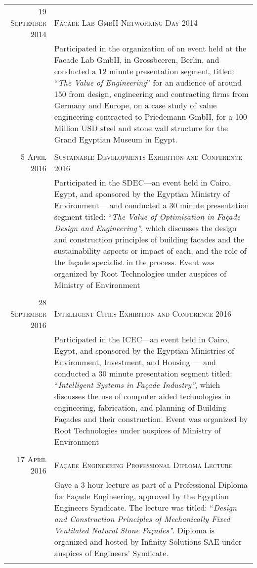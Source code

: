 \documentclass[a4paper,11pt]{article} %
\begin{document}
\begin{tabular}{r|p{11cm}}
\textsc{19 September 2014} & \textsc{Facade Lab GmbH Networking Day 2014}\\ 
& \footnotesize{Participated in the organization of an event held at the Facade Lab GmbH, in Grossbeeren, Berlin, and conducted a 12 minute presentation segment, titled: ``\emph{The Value of Engineering}'' for an audience of around 150 from design, engineering and contracting firms from Germany and Europe, on a case study of value engineering contracted to Priedemann GmbH, for a 100 Million USD steel and stone wall structure for the Grand Egyptian Museum in Egypt.}\\
\multicolumn{2}{c}{} \\

\textsc{5 April 2016} & \textsc{Sustainable Developments Exhibition and Conference 2016}\\ 
& \footnotesize{Participated in the SDEC---an event held in Cairo, Egypt, and sponsored by the Egyptian Ministry of Environment--- and conducted a 30 minute presentation segment titled: ``\emph{The Value of Optimisation in Fa\c{c}ade Design and Engineering''}, which discusses the design and construction principles of building facades and the sustainability aspects or impact of each, and the role of the fa\c{c}ade specialist in the process. Event was organized by Root Technologies under auspices of Ministry of Environment}\\
\multicolumn{2}{c}{} \\

\textsc{28 September 2016} & \textsc{Intelligent Cities Exhibition and Conference 2016}\\ 
& \footnotesize{Participated in the ICEC---an event held in Cairo, Egypt, and sponsored by the Egyptian Ministries of Environment, Investment, and Housing --- and conducted a 30 minute presentation segment titled: ``\emph{Intelligent Systems in Fa\c{c}ade Industry''}, which discusses the use of computer aided technologies in engineering, fabrication, and planning of Building Fa\c{c}ades and their construction. Event was organized by Root Technologies under auspices of Ministry of Environment}\\
\multicolumn{2}{c}{} \\

\textsc{17 April 2016} & \textsc{Fa\c{c}ade Engineering Professional Diploma Lecture}\\ 
& \footnotesize{Gave a 3 hour lecture as part of a Professional Diploma for Fa\c{c}ade Engineering, approved by the Egyptian Engineers Syndicate. The lecture was titled: ``\emph{Design and Construction Principles of Mechanically Fixed Ventilated Natural Stone Fa\c{c}ades'}'. Diploma is organized and hosted by Infinity Solutions SAE under auspices of Engineers' Syndicate.}\\
\multicolumn{2}{c}{} \\
	
\end{tabular}
\end{document}
